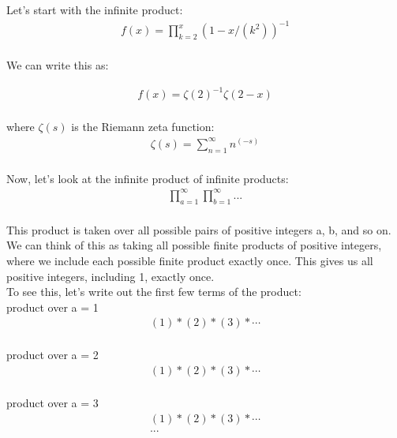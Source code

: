 \documentclass{article}
\begin{document}
Let's start with the infinite product: \\

\begin{align*}
f(x) = \prod_{k=2}^x \left(1 - x/ \left(k^2\right)\right)^{-1} \\
\end{align*}

We can write this as:

\begin{align*}
f(x) = {\zeta\left(2\right)^{-1}}{\zeta\left(2-x\right)} \\
\end{align*}

where $\zeta(s)$ is the Riemann zeta function: \\

\begin{align*}
\zeta(s) = \sum_{n=1}^\infty n^\left(-s\right) \\
\end{align*}

Now, let's look at the infinite product of infinite products: \\

\begin{align*}
\prod_{a=1}^\infty \prod_{b=1}^\infty ... \\
\end{align*}

This product is taken over all possible pairs of positive integers a, b, and so on. We can think of this as taking all possible finite products of positive integers, where we include each possible finite product exactly once. This gives us all positive integers, including 1, exactly once. \\

To see this, let's write out the first few terms of the product: \\

product over a = 1 
\begin{align*}
(1) * (2) * (3) * \cdots \\
\end{align*}

product over a = 2
\begin{align*}
(1) * (2) * (3) * \cdots \\
\end{align*}

product over a = 3 
\begin{align*}
(1) * (2) * (3) * \cdots \\
...
\end{align*}
\end{document}
